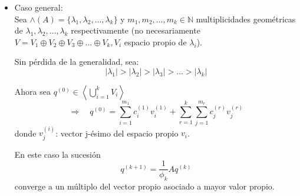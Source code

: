 \documentclass[12pt,a4paper]{article}
\newcommand{\ds}{\displaystyle}
\begin{document}
\begin{multicols}{2}
\begin{itemize}

    

\item Caso general:\\
Sea $\wedge(A)=\{\lambda_{1},\lambda_{2},\ldots ,\lambda_{k}\}$ y $m_{1},m_{2}, \ldots , m_{k}\in\mathbb{N}$ multiplicidades geométricas de $\lambda_{1},\lambda_{2},\ldots ,\lambda_{k}$ respectivamente (no necesariamente $V=V_{1}\oplus V_{2}\oplus V_{3}\oplus\ldots\oplus V_{k}, V_{i}$ espacio propio de $\lambda_{i}$).
	
Sin pérdida de la generalidad, sea:
$$\vert\lambda_{1}\vert > \vert\lambda_{2}\vert > \vert\lambda_{3}\vert > \ldots>\vert\lambda_{k}\vert$$
	
Ahora sea $q^{(0)}\in\left<\bigcup_{i=1}^{k}V_{i}\right>$
$$\Rightarrow\quad q^{(0)} = \sum_{i=1}^{m_{1}}c_{i}^{(1)}v_{i}^{(1)} + \sum_{r=1}^{k}\sum_{j=1}^{m_{r}}c_{j}^{(r)}v_{j}^{(r)}$$
donde $v_{j}^{(i)}$: vector j-ésimo del espacio propio $v_{i}$.



En este caso la sucesión $$q^{(k+1)}=\frac{1}{\phi_{k}}Aq^{(k)}$$ converge a un múltiplo del vector propio asociado a mayor valor propio.\\


\end{itemize}
\end{multicols}
\end{document}
